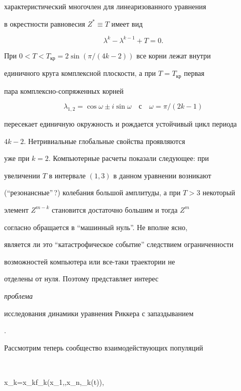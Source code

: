 характеристический многочлен для линеаризованного уравнения


 в окрестности равновесия $Z^*\equiv T$ имеет вид


\begin{equation}


\lambda^k-\lambda^{k-1}+T=0.


\label{1.12}


\end{equation}




При $0<T<T_{кр}=2\sin(\pi/(4k-2))$ все корни  лежат внутри


единичного круга комплексной плоскости, а при $T=T_{кр}$ первая 


пара комплексно-сопряженных корней


$$


\lambda_{1,2}=\cos\omega\pm i\sin\omega\quad\text{с} 


\quad \omega=\pi/(2k-1)


$$


пересекает единичную окружность и рождается устойчивый цикл периода 


$4k-2$. Нетривиальные глобальные свойства  проявляются 


уже при $k=2$. Компьютерные расчеты показали следующее: при 


увеличении $T$ в интервале $(1,3)$ в данном уравнении возникают 


(``резонансные''\,?) колебания большой амплитуды, а при $T>3$ некоторый


элемент $Z^{m-k}$ становится достаточно большим и тогда $Z^m$ 


согласно  обращается в ``машинный нуль''. Не вполне ясно, 


является ли это ``катастрофическое событие'' следствием ограниченности 


возможностей компьютера или все-таки траектории  не 


отделены от нуля. Поэтому представляет интерес {\it проблема 


исследования динамики уравнения Риккера с запаздыванием} .





Рассмотрим теперь сообщество взаимодействующих популяций


$$


\Dot x_k=x_kf_k(x_1,\dotsc,x_n,\beta_k(t)),



